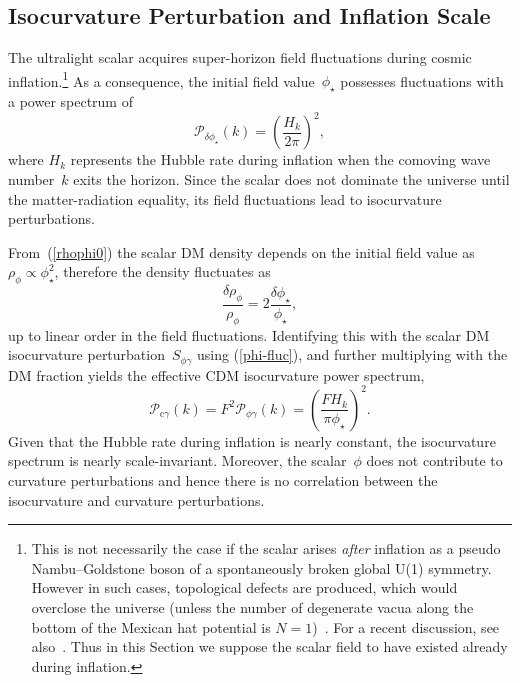\documentclass[11pt,nofootinbib]{article}
\numberwithin{equation}{section}
\begin{document}
\subsection{Isocurvature Perturbation and Inflation Scale}
\label{subsec:iso}

The ultralight scalar acquires super-horizon field fluctuations during
cosmic inflation.\footnote{This is not necessarily the case if
the scalar arises {\it after} inflation as a 
pseudo Nambu--Goldstone boson of a spontaneously broken global U(1) symmetry.
However in such cases, topological defects are produced, which would
overclose the universe (unless the number of degenerate vacua along the
bottom of the Mexican hat potential is
$N=1$)~\cite{Vilenkin:1982ks,Sikivie:1982qv,Linde:1990yj}.
For a recent discussion, see also~\cite{Visinelli:2017imh}.
Thus in this Section we suppose the scalar field to have
existed already during inflation.}
As a consequence, the initial field value~$\phi_\star$
possesses fluctuations with a power spectrum of 
\begin{equation}
 \mathcal{P_{\delta \phi_\star}} (k) = 
  \left( \frac{H_k}{2 \pi} \right)^2,
\label{phi-fluc}
\end{equation}
where $H_k$ represents the Hubble rate during inflation when the comoving
wave number~$k$ exits the horizon.
Since the scalar does not dominate the universe until the
matter-radiation equality, its field fluctuations lead to
isocurvature perturbations.

From~(\ref{rhophi0}) the scalar DM density depends on the
initial field value as $\rho_\phi \propto \phi_\star^2$, therefore
the density fluctuates as
\begin{equation}
 \frac{\delta \rho_\phi }{\rho_\phi} = 2 \frac{ \delta \phi_\star }{ \phi_\star},
\end{equation}
up to linear order in the field fluctuations.
Identifying this with the scalar DM isocurvature perturbation~$S_{\phi \gamma}$
using (\ref{phi-fluc}),
and further multiplying with the DM fraction yields the effective CDM
isocurvature power spectrum,
\begin{equation}
 \mathcal{P}_{\mathrm{c} \gamma} (k) =
  F^2
  \mathcal{P}_{\phi \gamma} (k) =
    \left( \frac{F  H_k}{\pi
     \phi_\star} \right)^2 .
\label{effCiso}
\end{equation}
Given that the Hubble rate during inflation is nearly constant,
the isocurvature spectrum is nearly scale-invariant.
Moreover, the scalar~$\phi$ does not contribute to curvature
perturbations and hence there is no correlation between the 
isocurvature and curvature perturbations.
\end{document}
